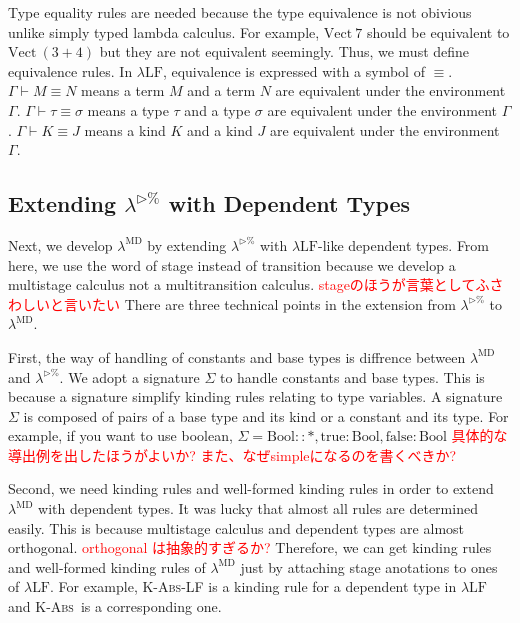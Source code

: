 \documentclass[runningheads]{llncs}
\newcommand{\red}[1]{\textcolor{red}{#1 }}
\newcommand{\LTP}{$\lambda^{\triangleright\%}$\xspace}
\newcommand{\LMD}{$\lambda^{\textrm{MD}}$\xspace}
\newcommand{\LLF}{$\lambda\textrm{LF}$\xspace}
\newcommand{\G}{\Gamma}
\newcommand{\V}{\vdash_\Sigma}
\newcommand{\E}{\equiv}
\newcommand{\KAbs}{\textsc{K-Abs}}
\newcommand{\B}{\textrm{Bool}}
\begin{document}
Type equality rules are needed because the type equivalence is not obivious unlike simply typed lambda calculus.
For example, $\textrm{Vect}\ 7$ should be equivalent to $\textrm{Vect}\ (3+4)$
but they are not equivalent seemingly. Thus, we must define equivalence rules.
In \LLF, equivalence is expressed with a symbol of $\E$.
$\G \vdash M \E N$ means a term $M$ and a term $N$ are equivalent under the environment $\G$.
$\G \vdash \tau \E \sigma$ means a type $\tau$ and a type $\sigma$ are equivalent under the environment $\G$.
$\G \vdash K \E J$ means a kind $K$ and a kind $J$ are equivalent under the environment $\G$.

\subsection{Extending \LTP with Dependent Types}

Next, we develop \LMD by extending \LTP with \LLF-like dependent types.
From here, we use the word of stage instead of transition 
because we develop a multistage calculus not a multitransition calculus.
\red{stageのほうが言葉としてふさわしいと言いたい}
There are three technical points in the extension from \LTP to \LMD.


First, the way of handling of constants and base types is diffrence between \LMD and \LTP.
We adopt a signature $\Sigma$ to handle constants and base types.
This is because a signature simplify kinding rules relating to type variables.
A signature $\Sigma$ is composed of pairs of a base type and its kind or a constant and its type.
For example, if you want to use boolean, $\Sigma = \B::*, \text{true}:\B, \text{false}:\B$
\red{具体的な導出例を出したほうがよいか? また、なぜsimpleになるのを書くべきか?}


Second, we need kinding rules and well-formed kinding rules in order to extend \LMD with dependent types.
It was lucky that almost all rules are determined easily.
This is because multistage calculus and dependent types are almost orthogonal.
\red{orthogonal は抽象的すぎるか?}
Therefore, we can get kinding rules and well-formed kinding rules of \LMD just by 
attaching stage anotations to ones of \LLF.
For example, \KAbs-LF is a kinding rule for a dependent type in \LLF and \KAbs\ is a corresponding one.
\begin{center}
	\infrule{\G\vdash \tau :: * \andalso \G,x:\tau@A\vdash \sigma::J}{\G\vdash(\Pi x:\tau.\sigma) :: (\Pi x:\tau.J)}{\KAbs-LF} \\[2mm]
	\infrule{\G\V \tau :: *@A \andalso \G,x:\tau@A\V \sigma::J@A}{\G\V(\Pi x:\tau.\sigma) :: (\Pi x:\tau.J)@A}{\KAbs} \\[2mm]
\end{center}
\end{document}
